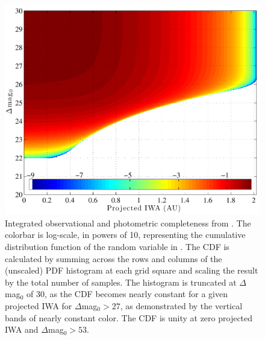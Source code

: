 \begin{figure}[ht]
\centering
\includegraphics[width=5.5in]{./figures/earthTwin_cdf}
 \caption[Earth-twin observation CDF]{Integrated observational and photometric completeness from . The colorbar is log-scale, in powers of 10, representing the cumulative distribution function of the random variable in .  The CDF is calculated by summing across the rows and columns of the (unscaled) PDF histogram at each grid square and scaling the result by the total number of samples.  The histogram is truncated at $\Delta$mag$_0$ of 30, as the CDF becomes nearly constant for a given projected IWA for $\Delta$mag$_0 > 27$, as demonstrated by the vertical bands of nearly constant color.  The CDF is unity at zero projected IWA and $\Delta$mag$_0 > 53$.}
\label{fig:earthTwin_cdf} 
\end{figure} 

